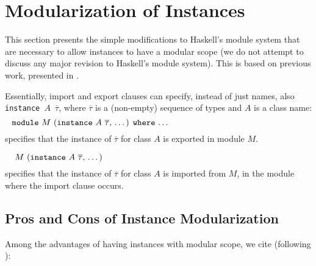\section{Modularization of Instances}
\label{sec:modular-instances}

This section presents the simple modifications to Haskell's module
system that are necessary to allow instances to have a modular scope
(we do not attempt to discuss any major revision to Haskell's module
system). This is based on previous work, presented in
\cite{Controlling-scope-instances}.

Essentially, import and export clauses can specify, instead of just
names, also {\tt instance $A$ $\overline{\tau}$}, where
$\overline{\tau}$ is a (non-empty) sequence of types and $A$ is a
class name:
  \[ \parbox{\textwidth}{\rm{ \module\ $M$ (\instance\ $A$ $\overline{\tau}$, \ldots) \where\ \ldots}} \]
specifies that the instance of $\overline{\tau}$ for class $A$ is
exported in module $M$.

  \[ \parbox{\textwidth}{\rm{ \ $M$ (\instance\ $A$ $\overline{\tau}$, \ldots)}} \]
specifies that the instance of $\overline{\tau}$ for class $A$ is
imported from $M$, in the module where the import clause occurs.

\subsection{Pros and Cons of Instance Modularization}

Among the advantages of having instances with modular scope, we cite
(following \cite{Controlling-scope-instances}):

